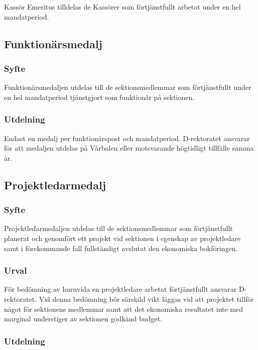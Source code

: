 \documentclass{dgovdoc}
\begin{document}
Kassör Emeritus tilldelas de Kassörer som förtjänstfullt arbetat under
en hel mandatperiod.

\subsection{Funktionärsmedalj}

\subsubsection{Syfte}

Funktionärsmedaljen utdelas till de sektionsmedlemmar som förtjänstfullt under
en hel mandatperiod tjänstgjort som funktionär på sektionen.

\subsubsection{Utdelning}

Endast en medalj per funktionärspost och mandatperiod. D-rektoratet ansvarar för att medaljen utdelas på
Vårbalen eller motsvarande högtidligt tillfälle samma år.

\subsection{Projektledarmedalj}

\subsubsection{Syfte}

Projektledarmedaljen utdelas till de sektionsmedlemmar som förtjänstfullt
planerat och genomfört ett projekt vid sektionen i egenskap av projektledare
samt i förekommande fall fullständigt avslutat den ekonomiska bokföringen.

\subsubsection{Urval}

För bedömning av huruvida en projektledare arbetat förtjänstfullt ansvarar
D-rektoratet. Vid denna bedömning bör särskild vikt läggas vid att projektet
tillför något för sektionens medlemmar samt att det ekonomiska resultatet inte
med marginal understiger av sektionen godkänd budget.

\subsubsection{Utdelning}
\end{document}
